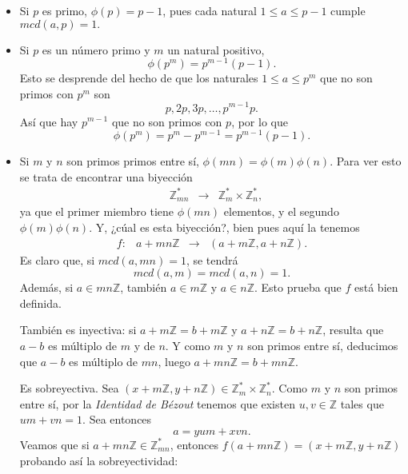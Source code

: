 \documentclass[12pt]{article}
\begin{document}
\begin{itemize}
\item Si $p$ es primo, $\phi(p) = p-1$, pues cada natural $1 \leq a \leq p-1$ cumple $mcd(a,p)=1.$
\item Si $p$ es un número primo y $m$ un natural positivo, $$\phi(p^{m})= p^{m-1}(p-1).$$ Esto se desprende del hecho de que los naturales $1 \leq a \leq p^{m}$ que no son primos con $p^{m}$ son $$p, 2p, 3p, \ldots, p^{m-1}p.$$ Así que hay $p^{m-1}$ que no son primos con $p$, por lo que $$\phi(p^{m}) = p^{m}-p^{m-1} = p^{m-1}(p-1).$$
\item Si $m$ y $n$ son primos primos entre sí, $\phi(mn)= \phi(m) \phi(n)$. Para ver esto se trata de encontrar una biyección 
$$\begin{array}{rccl}
&\mathbb{Z}_{mn}^{\ast} & \longrightarrow &\mathbb{Z}_{m}^{\ast} \times \mathbb{Z}_{n}^{\ast},
\end{array}
$$ 
ya que el primer miembro tiene $\phi(mn)$ elementos, y el segundo $\phi(m)\phi(n)$. Y, ¿cúal es esta biyección?, bien pues aquí la tenemos 
$$\begin{array}{rccl}
f \colon &a + mn\mathbb{Z}& \longrightarrow &(a+ m\mathbb{Z}, a + n\mathbb{Z}).
\end{array}
$$ 
Es claro que, si $mcd(a,mn)=1$, se tendrá $$mcd(a,m)= mcd(a,n)=1.$$ Además, si $a \in mn\mathbb{Z}$, también $a \in m\mathbb{Z}$ y $a \in n\mathbb{Z}$. Esto prueba que $f$ está bien definida.

También es inyectiva: si $a + m\mathbb{Z} = b + m\mathbb{Z}$ y $a + n\mathbb{Z} = b + n\mathbb{Z}$, resulta que $a-b$ es múltiplo de $m$ y de $n$. Y como $m$ y $n$ son primos entre sí, deducimos que $a-b$ es múltiplo de $mn$, luego $a + mn\mathbb{Z}= b + mn\mathbb{Z}$.

Es sobreyectiva. Sea $(x + m\mathbb{Z}, y + n\mathbb{Z}) \in \mathbb{Z}_{m}^{\ast} \times \mathbb{Z}_{n}^{\ast}$. Como $m$ y $n$ son primos entre sí, por la \textit{Identidad de Bézout} tenemos que existen $u,v \in \mathbb{Z}$ tales que $um + vn = 1$. Sea entonces $$a = yum + xvn.$$
Veamos que si $a + mn\mathbb{Z} \in \mathbb{Z}_{mn}^{\ast}$, entonces $f(a + mn\mathbb{Z}) = (x + m\mathbb{Z}, y + n\mathbb{Z})$ probando así la sobreyectividad:


\end{itemize}
\end{document}
